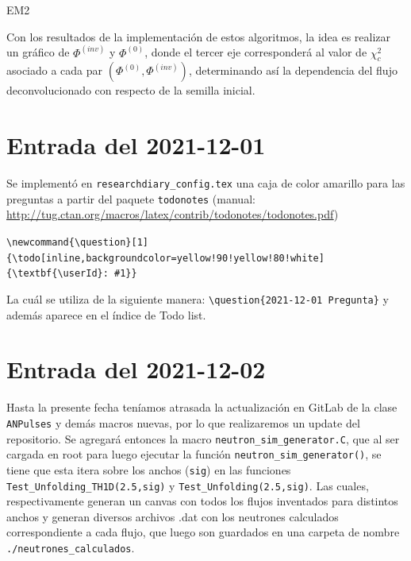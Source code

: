 \documentclass[11pt,letterpaper]{article}
\newcommand{\userId}{flopez}
\begin{document}
\begin{algorithm}[H]\label{em2}
\caption{EM2\label{EM2}}
\end{algorithm}

Con los resultados de la implementación de estos algoritmos, la idea es realizar un gráfico de $\Phi^{(inv)}$ y $\Phi^{(0)}$, donde el tercer eje corresponderá al valor de $\chi_c^2$ asociado a cada par $(\Phi^{(0)},\Phi^{(inv)})$, determinando así la dependencia del flujo deconvolucionado con respecto de la semilla inicial.


\section{Entrada del 2021-12-01}
\label{2021-12-01}

Se implementó en \verb|researchdiary_config.tex| una caja de color amarillo para las preguntas a partir del paquete \verb|todonotes| (manual: \url{http://tug.ctan.org/macros/latex/contrib/todonotes/todonotes.pdf})

\verb|\newcommand{\question}[1]{\todo[inline,backgroundcolor=yellow!90!yellow!80!white]|\\
\verb|{\textbf{\userId}: #1}}|

La cuál se utiliza de la siguiente manera: \verb|\question{2021-12-01 Pregunta}| y además aparece en el índice de Todo list.


\section{Entrada del 2021-12-02}
\label{2021-12-01}

Hasta la presente fecha teníamos atrasada la actualización en GitLab de la clase \verb|ANPulses| y demás macros nuevas, por lo que realizaremos un update del repositorio. Se agregará entonces la macro \verb|neutron_sim_generator.C|, que al ser cargada en root para luego ejecutar la función \verb|neutron_sim_generator()|, se tiene que esta itera sobre los anchos (\verb|sig|) en las funciones \verb|Test_Unfolding_TH1D(2.5,sig)| y \verb|Test_Unfolding(2.5,sig)|. Las cuales, respectivamente generan un canvas con todos los flujos inventados para distintos anchos y generan diversos archivos .dat con los neutrones calculados correspondiente a cada flujo, que luego son guardados en una carpeta de nombre \verb|./neutrones_calculados|.
\end{document}
